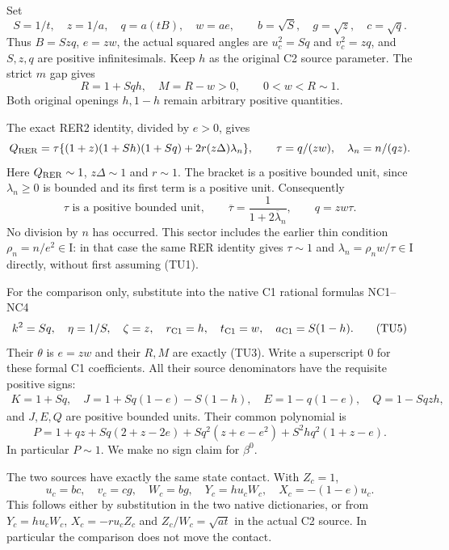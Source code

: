 Set
\[
 S=1/t,\quad z=1/a,\quad q=a(tB),\quad w=ae,\qquad
 b=\sqrt S,\quad g=\sqrt z,\quad c=\sqrt q.
                                                               \tag{TU2}
\]
Thus $B=Szq$, $e=zw$, the actual squared angles are
$u_c^2=Sq$ and $v_c^2=zq$, and $S,z,q$ are positive
infinitesimals.  Keep $h$ as the original C2 source parameter.
The strict $m$ gap gives
\[
 R=1+Sqh,\quad M=R-w>0,
 \qquad 0<w<R\sim1.                                      \tag{TU3}
\]
Both original openings $h,1-h$ remain arbitrary positive quantities.

The exact RER2 identity, divided by $e>0$, gives
\[
 Q_{\rm RER}
 =\tau\{(1+z)(1+Sh)(1+Sq)+2r(z\Delta)\lambda_n\},
 \qquad \tau=q/(zw),\quad \lambda_n=n/(qz).
\]
Here $Q_{\rm RER}\sim1$, $z\Delta\sim1$ and $r\sim1$.
The bracket is a positive bounded unit, since $\lambda_n\geq0$
is bounded and its first term is a positive unit.  Consequently
\[
 \tau\text{ is a positive bounded unit},\qquad
 \overline\tau=\frac1{1+2\overline\lambda_n},\qquad
 q=zw\tau.
                                                               \tag{TU4}
\]
No division by $n$ has occurred.  This sector includes the earlier
thin condition $\rho_n=n/e^2\in\mathrm I$: in that case the same
RER identity gives $\tau\sim1$ and
$\lambda_n=\rho_nw/\tau\in\mathrm I$ directly, without first
assuming (TU1).

For the comparison only, substitute into the native C1 rational
formulas NC1--NC4
\[
 k^2=Sq,\quad \eta=1/S,\quad \zeta=z,\quad
 r_{\rm C1}=h,\quad t_{\rm C1}=w,\quad
 a_{\rm C1}=S(1-h).                                     \tag{TU5}
\]
Their $\theta$ is $e=zw$ and their $R,M$ are exactly (TU3).
Write a superscript $0$ for these formal C1 coefficients.
All their source denominators have the requisite positive signs:
\[
\begin{gathered}
 K=1+Sq,\quad J=1+Sq(1-e)-S(1-h),\quad
 E=1-q(1-e),\quad Q=1-Sqzh,
\end{gathered}
\]
and $J,E,Q$ are positive bounded units.  Their common polynomial is
\[
 P=1+qz+Sq(2+z-2e)+Sq^2(z+e-e^2)+S^2hq^2(1+z-e).
                                                               \tag{TU6}
\]
In particular $P\sim1$.  We make no sign claim for $\beta^0$.

The two sources have exactly the same state contact.  With $Z_c=1$,
\[
 u_c=bc,\quad v_c=cg,\quad W_c=bg,\quad
 Y_c=hu_cW_c,\quad X_c=-(1-e)u_c.                       \tag{TU7}
\]
This follows either by substitution in the two native dictionaries,
or from $Y_c=hu_cW_c$, $X_c=-ru_cZ_c$ and
$Z_c/W_c=\sqrt{at}$ in the actual C2 source.  In particular
the comparison does not move the contact.

